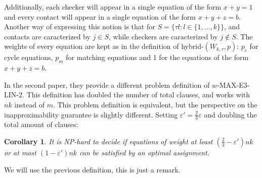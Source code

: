\documentclass[12pt]{article}
\newtheorem{corollary}{Corollary}
\begin{document}
Additionally, each checker will appear in a single equation of the form $x+y=1$ and every contact will appear in a single equation of the form $x+y+z=b$.
Another way of expressing this notion is that for $S =\{\tau l : l\in \{1, \ldots, k\}\}$, and contacts are caracterized by $j\in S$, while checkers are caracterized by $j\notin S$.
The weights of every equation are kept as in the definition of hybrid-$(W_{k,\tau},p)$: $p_c$ for cycle equations, $p_m$ for matching equations and 1 for the equations of the form $x+y+z=b$.

In the second paper, they provide a different problem definition of $w$-MAX-E3-LIN-2. This definition has doubled the number of total clauses, and works with $nk$ instead of $m$. 
This problem definition is equivalent, but the perspective on the inapproximability guarantee is slightly different. Setting $\varepsilon'=\frac{2}{3}\varepsilon$ and doubling the total amount of clauses:

\begin{corollary}
    It is NP-hard to decide if equations of weight at least  $(\frac{2}{3}-\varepsilon') nk$ or at most $(1 - \varepsilon')nk$  can be satisfied by an optimal assignment.
\end{corollary}
We will use the previous definition, this is just a remark. 
\end{document}
